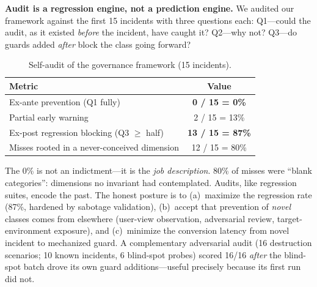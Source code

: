 \documentclass[conference]{IEEEtran}
\begin{document}
\textbf{Audit is a regression engine, not a prediction engine.} We audited
our framework against the first 15 incidents with three questions each:
Q1---could the audit, as it existed \emph{before} the incident, have caught
it? Q2---why not? Q3---do guards added \emph{after} block the class going
forward?

\begin{table}[h]
\centering
\caption{Self-audit of the governance framework (15 incidents).}
\label{tab:scorecard}
\footnotesize
\begin{tabular}{@{}p{6.0cm}c@{}}
\toprule
\textbf{Metric} & \textbf{Value}\\
\midrule
Ex-ante prevention (Q1 fully) & \textbf{0 / 15 = 0\%}\\
Partial early warning & 2 / 15 = 13\%\\
Ex-post regression blocking (Q3 $\geq$ half) & \textbf{13 / 15 = 87\%}\\
Misses rooted in a never-conceived dimension & 12 / 15 = 80\%\\
\bottomrule
\end{tabular}
\end{table}

The 0\% is not an indictment---it is the \emph{job description}. 80\% of
misses were ``blank categories'': dimensions no invariant had
contemplated. Audits, like regression suites, encode the past. The honest
posture is to (a)~maximize the regression rate (87\%, hardened by sabotage
validation), (b)~accept that prevention of \emph{novel} classes comes from
elsewhere (user-view observation, adversarial review, target-environment
exposure), and (c)~minimize the conversion latency from novel incident to
mechanized guard. A complementary adversarial audit (16 destruction
scenarios; 10 known incidents, 6 blind-spot probes) scored 16/16
\emph{after} the blind-spot batch drove its own guard additions---useful
precisely because its first run did not.
\end{document}
